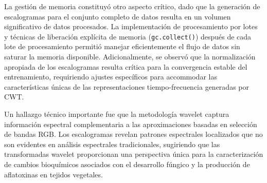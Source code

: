 La gestión de memoria constituyó otro aspecto crítico, dado que la generación de escalogramas para el conjunto completo de datos resulta en un volumen significativo de datos procesados. La implementación de procesamiento por lotes y técnicas de liberación explícita de memoria (\texttt{gc.collect()}) después de cada lote de procesamiento permitió manejar eficientemente el flujo de datos sin saturar la memoria disponible. Adicionalmente, se observó que la normalización apropiada de los escalogramas resulta crítica para la convergencia estable del entrenamiento, requiriendo ajustes específicos para accommodar las características únicas de las representaciones tiempo-frecuencia generadas por CWT.

\vspace{5mm}

Un hallazgo técnico importante fue que la metodología wavelet captura información espectral complementaria a las aproximaciones basadas en selección de bandas RGB. Los escalogramas revelan patrones espectrales localizados que no son evidentes en análisis espectrales tradicionales, sugiriendo que las transformadas wavelet proporcionan una perspectiva única para la caracterización de cambios bioquímicos asociados con el desarrollo fúngico y la producción de aflatoxinas en tejidos vegetales.

